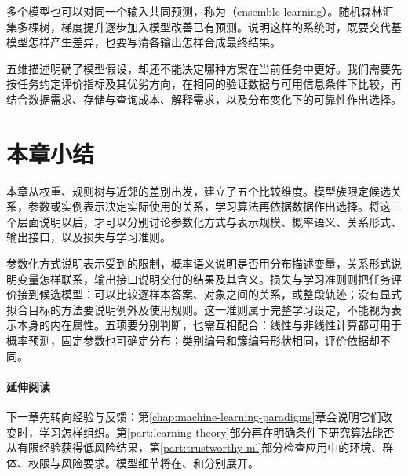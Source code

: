 多个模型也可以对同一个输入共同预测，称为（ensemble learning）。随机森林汇集多棵树，梯度提升逐步加入模型改善已有预测。说明这样的系统时，既要交代基模型怎样产生差异，也要写清各输出怎样合成最终结果。

五维描述明确了模型假设，却还不能决定哪种方案在当前任务中更好。我们需要先按任务约定评价指标及其优劣方向，在相同的验证数据与可用信息条件下比较，再结合数据需求、存储与查询成本、解释需求，以及分布变化下的可靠性作出选择。

\section{本章小结}
\label{sec:models-summary}

本章从权重、规则树与近邻的差别出发，建立了五个比较维度。模型族限定候选关系，参数或实例表示决定实际使用的关系，学习算法再依据数据作出选择。将这三个层面说明以后，才可以分别讨论参数化方式与表示规模、概率语义、关系形式、输出接口，以及损失与学习准则。

参数化方式说明表示受到的限制，概率语义说明是否用分布描述变量，关系形式说明变量怎样联系，输出接口说明交付的结果及其含义。损失与学习准则则把任务评价接到候选模型：可以比较逐样本答案、对象之间的关系，或整段轨迹；没有显式拟合目标的方法要说明例外及使用规则。这一准则属于完整学习设定，不能视为表示本身的内在属性。五项要分别判断，也需互相配合：线性与非线性计算都可用于概率预测，固定参数也可确定分布；类别编号和簇编号形状相同，评价依据却不同。

\paragraph{延伸阅读}

下一章先转向经验与反馈：第\ref{chap:machine-learning-paradigms}章会说明它们改变时，学习怎样组织。第\ref{part:learning-theory}部分再在明确条件下研究算法能否从有限经验获得低风险结果，第\ref{part:trustworthy-ml}部分检查应用中的环境、群体、权限与风险要求。模型细节将在、和分别展开。
